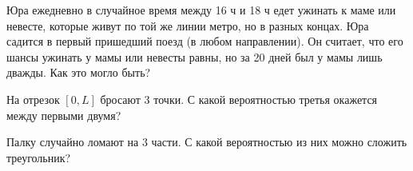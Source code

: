 \documentclass[a4paper,11pt]{article}
\begin{document}















%













Юра ежедневно в случайное время между 16 ч и 18 ч едет ужинать к маме или невесте, которые живут по той же линии метро,
но в разных концах. Юра садится в первый пришедший поезд (в любом направлении).
Он считает, что его шансы ужинать у мамы или невесты равны,
но за 20 дней был у мамы лишь дважды. Как это могло быть?














%


На отрезок $[0, L]$ бросают 3 точки.
С какой вероятностью третья окажется между первыми двумя?














Палку %
случайно ломают на 3 части. С какой вероятностью
из них можно сложить треугольник?


\end{document}
